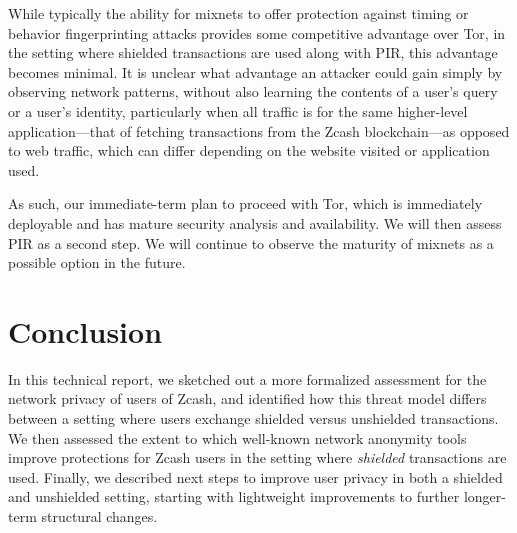 \documentclass{article}
\begin{document}
While typically the
ability for mixnets to offer protection
against timing or behavior fingerprinting attacks provides some competitive
advantage over Tor, in the setting where shielded transactions are used along
with PIR, this advantage becomes minimal. It is unclear what advantage an
attacker could gain simply by observing network patterns, without also learning
the contents of a user's query or a user's identity, particularly when all
traffic is for the same higher-level application---that of fetching
transactions from the Zcash
blockchain---as opposed to web traffic, which can differ depending on the
website visited or application used.

As such, our immediate-term plan to proceed with Tor, which is
immediately deployable and has mature security analysis and availability. We
will then assess PIR as a second step. We will continue to observe the maturity
of mixnets as a possible option in the future.

\section{Conclusion}
\label{conclusion}

In this technical report, we sketched out a more formalized assessment for the
network privacy of
users of Zcash, and identified how this threat model differs between a setting
where users exchange shielded versus unshielded transactions. We then assessed
the extent to which well-known network anonymity tools improve protections for
Zcash users in the setting where \emph{shielded} transactions are used.
Finally, we described next steps to improve user privacy in both a shielded and
unshielded setting, starting with lightweight improvements to further
longer-term structural changes.



\end{document}
